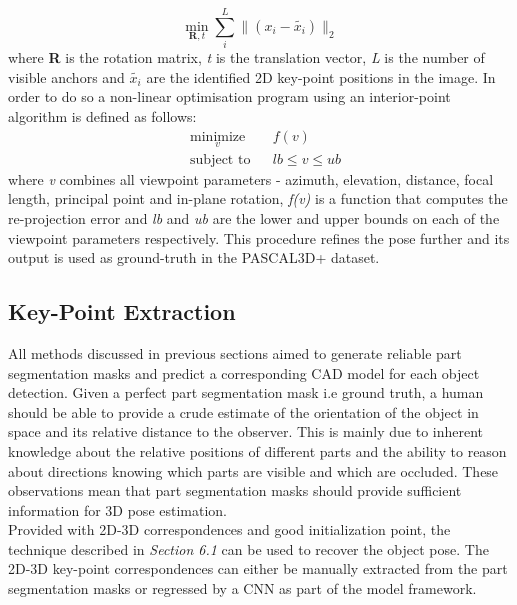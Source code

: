 \documentclass[main.tex]{subfiles}
\begin{document}
\begin{equation}
\min_{\textbf{R},t} \sum_i^L \| (x_i - \tilde{x_i})\|_2
\end{equation} 
where \textbf{R} is the rotation matrix, \emph{t} is the translation vector, \emph{L} is the number of visible anchors and \emph{$\tilde{x_i}$} are the identified 2D key-point positions in the image. In order to do so a non-linear optimisation program using an interior-point algorithm is defined as follows:
\begin{equation}
	\begin{aligned}
		& \underset{v}{\text{minimize}}
		& &  f(v) \\
		& \text{subject to}
		& &  lb \leq v \leq ub 
	\end{aligned}
\end{equation}
where \emph{v} combines all viewpoint parameters - azimuth, elevation, distance, focal length, principal point and in-plane rotation, \emph{f(v)} is a function that computes the re-projection error and \emph{lb} and \emph{ub} are the lower and upper bounds on each of the viewpoint parameters respectively. This procedure refines the pose further and its output is used as ground-truth in the PASCAL3D+ dataset.
\subsection{Key-Point Extraction}
All methods discussed in previous sections aimed to generate reliable part segmentation masks and predict a corresponding CAD model for each object detection. Given a perfect part segmentation mask i.e ground truth, a human should be able to provide a crude estimate of the orientation of the object in space and its relative distance to the observer. This is mainly due to inherent knowledge about the relative positions of different parts and the ability to reason about directions knowing which parts are visible and which are occluded. These observations mean that part segmentation masks should provide sufficient information for 3D pose estimation.\\
\indent Provided with 2D-3D correspondences and good initialization point, the technique described in \emph{Section 6.1} can be used to recover the object pose. The 2D-3D key-point correspondences can either be manually extracted from the part segmentation masks or regressed by a CNN as part of the model framework.
\end{document}
